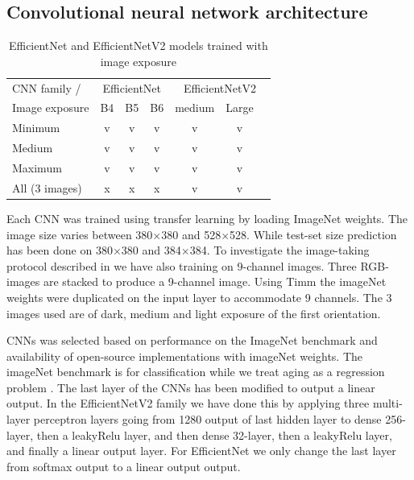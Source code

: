 \documentclass[10pt,letterpaper]{article}
\begin{document}
\subsection*{Convolutional neural network architecture}

\begin{center}
\begin{table}[hbt!]
\caption{EfficientNet and EfficientNetV2 models trained with image exposure}
\begin{tabular}{ |l|c|c|c|c|c|c| }
\hline
CNN family / & \multicolumn{3}{c|}{EfficientNet} & \multicolumn{3}{c|}{EfficientNetV2} \\
Image exposure & B4 & B5 & B6 & medium & Large  \\ 
\hline
Minimum & v & v & v & v & v  \\ 
Medium & v & v & v & v & v  \\ 
Maximum & v & v & v & v & v  \\ 
All (3 images) & x & x & x & v & v  \\ 
\hline
\end{tabular}
\label{table1}
\end{table}
\end{center}

Each CNN was trained using transfer learning by loading ImageNet  weights. The image size varies between 380$\times$380 and 528$\times$528. While test-set size prediction has been done on 380$\times$380 and 384$\times$384. To investigate the image-taking protocol described in \citep{codOtolithsMyers} we have also training on 9-channel images. Three RGB-images are stacked to produce a 9-channel image. Using Timm\citep{rw2019timm} the imageNet weights were duplicated on the input layer to accommodate 9 channels. The 3 images used are of dark, medium and light exposure of the first orientation.

CNNs was selected based on performance on the ImageNet benchmark and availability of open-source implementations with imageNet weights. The imageNet benchmark is for classification while we treat aging as a regression problem \citep{moenetal} \citep{vaboeetal}. The last layer of the CNNs has been modified to output a linear output. In the EfficientNetV2 family we have done this by applying three multi-layer perceptron layers going from 1280 output of last hidden layer to dense 256-layer, then a leakyRelu \citep{DBLP:journals/corr/XuWCL15} layer, and then dense 32-layer, then a leakyRelu layer, and finally a linear output layer. For EfficientNet we only change the last layer from softmax output to a linear output output.
\end{document}
